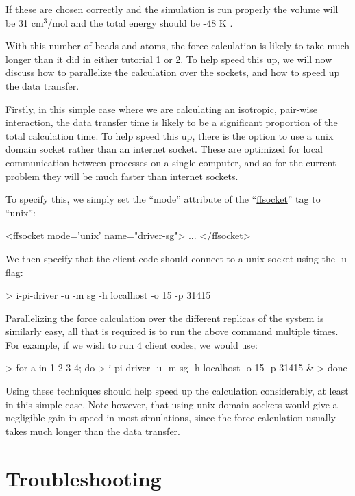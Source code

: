 \documentclass[11pt,english,fleqn]{report}
\newenvironment{code}{%
\footnotesize 
\verbatim
}{
\endverbatim
\normalsize
}
\begin{document}
If these are chosen correctly and the simulation is run properly
the volume will be 31 \(\textrm{cm}^3\)/mol and the total energy
should be -48 K \cite{mart+99jcp}.

With this number of beads and atoms, the force calculation is likely
to take much longer than it did in either tutorial 1 or 2.
To help speed this up, we will now discuss how to parallelize the
calculation over the sockets, and how to speed up the data transfer.

Firstly, in this simple case where we are calculating an isotropic,
pair-wise interaction, the data transfer time is likely to be a
significant proportion of the total calculation time. To help speed this
up, there is the option to use a unix domain socket rather than an
internet socket. These are optimized for local communication between 
processes on a single computer, and so for the current problem they will be much
faster than internet sockets.

To specify this, we simply set the {}``mode'' attribute of the
{}``\hyperref[FFSOCKET]{ffsocket}'' tag to {}``unix'':

\begin{code}
<ffsocket mode='unix' name="driver-sg">
   ...
</ffsocket>
\end{code}

We then specify that the client code should connect to a unix socket
using the -u flag:

\begin{code}
> i-pi-driver -u -m sg -h localhost -o 15 -p 31415
\end{code}

Parallelizing the force calculation over the different replicas of the system
is similarly easy, all that is required is to run the above
command multiple times. For example, if we wish to run
4 client codes, we would use:

\begin{code}
> for a in 1 2 3 4; do
>    i-pi-driver -u -m sg -h localhost -o 15 -p 31415 &
> done
\end{code}

Using these techniques should help speed up the calculation considerably,
at least in this simple case. Note however, that using unix domain sockets
would give a negligible gain in speed in most simulations, 
since the force calculation usually takes much longer than the data transfer. 

\chapter{Troubleshooting}
\end{document}
